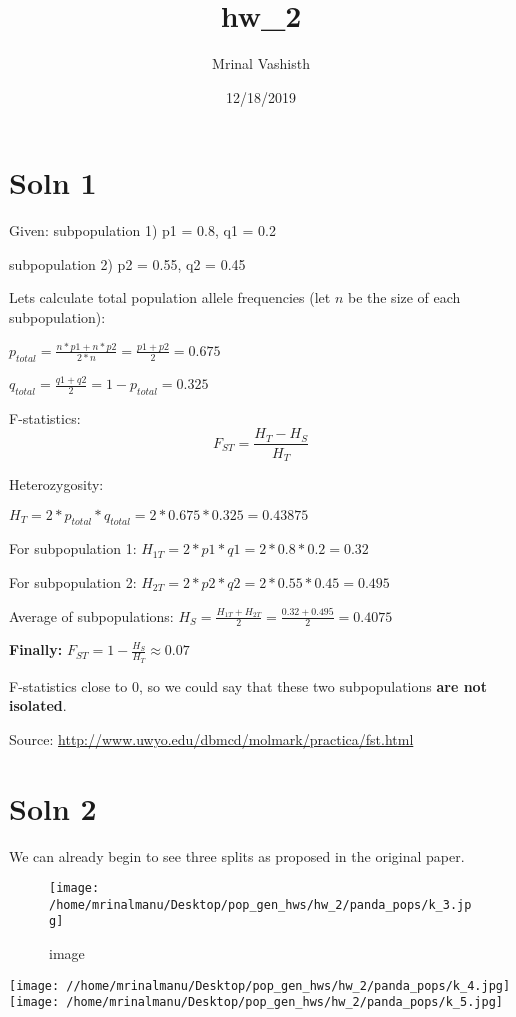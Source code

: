 \documentclass[]{article}
\title{hw\_2}
\author{Mrinal Vashisth}
\date{12/18/2019}
\begin{document}
\maketitle

\hypertarget{soln-1}{%
\section{Soln 1}\label{soln-1}}

Given: subpopulation 1) p1 = 0.8, q1 = 0.2

subpopulation 2) p2 = 0.55, q2 = 0.45

Lets calculate total population allele frequencies (let \(n\) be the
size of each subpopulation):

\(p_{total} = \frac{n*p1 + n*p2}{2*n}=\frac{p1+p2}{2}=0.675\)

\(q_{total} = \frac{q1+q2}{2}=1-p_{total}=0.325\)

F-statistics: \[F_{ST} = \frac{H_T - H_S}{H_T}\]

Heterozygosity:

\(H_T=2*p_{total}*q_{total}=2*0.675*0.325=0.43875\)

For subpopulation 1: \(H_{1T}=2*p1*q1=2*0.8*0.2=0.32\)

For subpopulation 2: \(H_{2T}=2*p2*q2=2*0.55*0.45=0.495\)

Average of subpopulations:
\(H_S = \frac{H_{1T} + H_{2T}}{2}=\frac{0.32+0.495}{2}=0.4075\)

\textbf{Finally:} \(F_{ST}= 1-\frac{H_S}{H_T}\approx0.07\)

F-statistics close to 0, so we could say that these two subpopulations
\textbf{are not isolated}.

Source: \url{http://www.uwyo.edu/dbmcd/molmark/practica/fst.html}

\hypertarget{soln-2}{%
\section{Soln 2}\label{soln-2}}

We can already begin to see three splits as proposed in the original
paper.

\begin{figure}
\centering
\texttt{[image: /home/mrinalmanu/Desktop/pop\_gen\_hws/hw\_2/panda\_pops/k\_3.jpg]}
\caption{image}
\end{figure}

\texttt{[image: //home/mrinalmanu/Desktop/pop\_gen\_hws/hw\_2/panda\_pops/k\_4.jpg]}
\texttt{[image: /home/mrinalmanu/Desktop/pop\_gen\_hws/hw\_2/panda\_pops/k\_5.jpg]}
\end{document}
